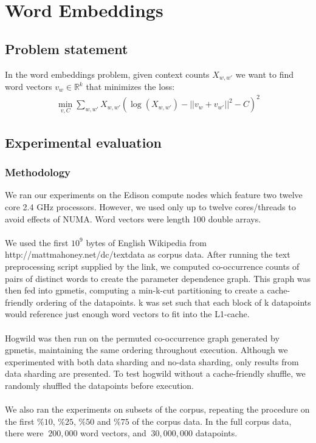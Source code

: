 \documentclass[times,11pt]{article}
\numberwithin{equation}{section}		%
\numberwithin{figure}{section}			%
\numberwithin{table}{section}				%
\newcommand{\ltwonorm}[1]{\left|\left|{#1}\right|\right|}
\begin{document}
\section{Word Embeddings}\label{sec:w2v}

\subsection{Problem statement}
In the word embeddings problem, given context counts $X_{w,w'}$ we want to find word vectors
$v_{w} \in \mathbb{R}^{k}$ that minimizes the loss:
\begin{align*}
\min_{v,C}\sum_{w,w'}X_{w,w'} \left(\log(X_{w,w'}) - \ltwonorm{v_w+v_{w'}}^2 - C\right)^2
\end{align*}

\subsection{Experimental evaluation}
\subsubsection{Methodology}

We ran our experiments on the Edison compute nodes which feature two
twelve core 2.4 GHz processors. However, we used only up to twelve
cores/threads to avoid effects of NUMA. Word vectors were length 100
double arrays.
\\\\
We used the first $10^9$ bytes of English Wikipedia from
http://mattmahoney.net/dc/textdata as corpus data. After running the text
preprocessing script supplied by the link, we computed co-occurrence
counts of pairs of distinct words to create the parameter dependence graph.
This graph was then fed into gpmetis, computing a min-k-cut partitioning to
create a cache-friendly ordering of the datapoints. k was set such that each
block of k datapoints would reference just enough word vectors to fit into the
L1-cache.
\\\\
Hogwild was then run on the permuted co-occurrence graph generated by gpmetis,
maintaining the same ordering throughout execution. Although we experimented with
both data sharding and no-data sharding, only results from data sharding are presented.
To test hogwild without a cache-friendly shuffle, we randomly shuffled the datapoints before execution.
\\\\
We also ran the experiments on subsets of the corpus, repeating the
procedure on the first $\%10$, $\%25$, $\%50$ and $\%75$ of the corpus data.
In the full corpus data, there were $~200,000$ word vectors, and $~30,000,000$
datapoints.
\end{document}

